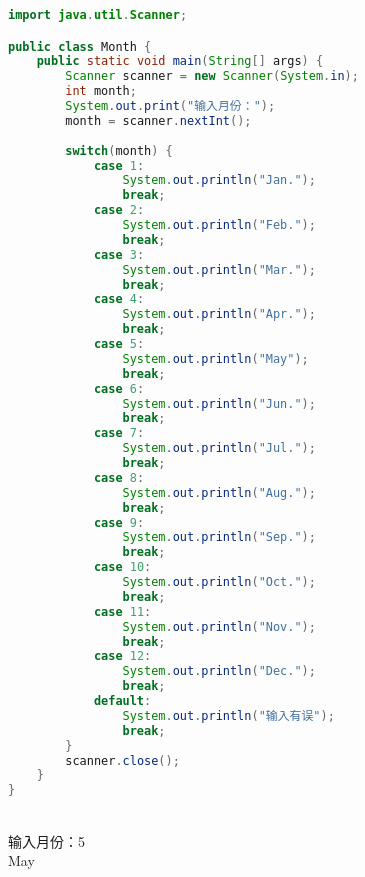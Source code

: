 
\begin{lstlisting}[language=Java]
import java.util.Scanner;

public class Month {
	public static void main(String[] args) {
		Scanner scanner = new Scanner(System.in);
		int month;
		System.out.print("输入月份：");
		month = scanner.nextInt();
		
		switch(month) {
			case 1:
				System.out.println("Jan.");
				break;
			case 2:
				System.out.println("Feb.");
				break;
			case 3:
				System.out.println("Mar.");
				break;
			case 4:
				System.out.println("Apr.");
				break;
			case 5:
				System.out.println("May");
				break;
			case 6:
				System.out.println("Jun.");
				break;
			case 7:
				System.out.println("Jul.");
				break;
			case 8:
				System.out.println("Aug.");
				break;
			case 9:
				System.out.println("Sep.");
				break;
			case 10:
				System.out.println("Oct.");
				break;
			case 11:
				System.out.println("Nov.");
				break;
			case 12:
				System.out.println("Dec.");
				break;
			default:
				System.out.println("输入有误");
				break;
		}
		scanner.close();
	}
}
\end{lstlisting}

\begin{tcolorbox}
	 \\
	输入月份：5 \\
	May
\end{tcolorbox}

\newpage